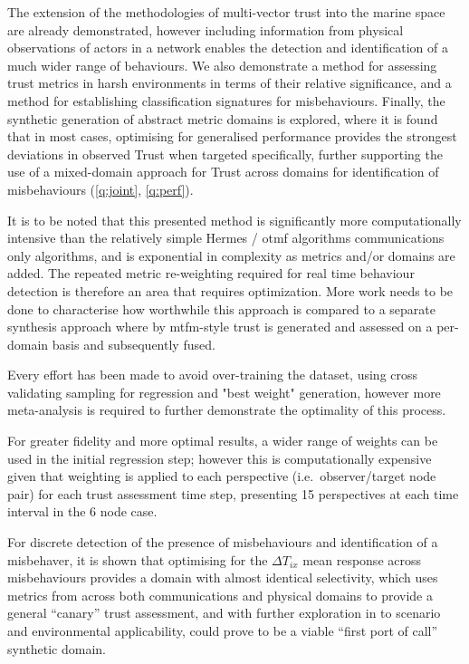 The extension of the methodologies of multi-vector trust into the marine space are already demonstrated, however including information from physical observations of actors in a network enables the detection and identification of a much wider range of behaviours.
We also demonstrate a method for assessing trust metrics in harsh environments in terms of their relative significance, and a method for establishing classification signatures for misbehaviours.
Finally, the synthetic generation of abstract metric domains is explored, where it is found that in most cases, optimising for generalised performance provides the strongest deviations in observed Trust when targeted specifically, further supporting the use of a mixed-domain approach for Trust across domains for identification of misbehaviours (\autoref{q:joint}, \autoref{q:perf}).

It is to be noted that this presented method is significantly more computationally intensive than the relatively simple Hermes / \gls{otmf} algorithms communications only algorithms, and is exponential in complexity as metrics and/or domains are added. The repeated metric re-weighting required for real time behaviour detection is therefore an area that requires optimization. More work needs to be done to characterise how worthwhile this approach is compared to a separate synthesis approach where by \gls{mtfm}-style trust is generated and assessed on a per-domain basis and subsequently fused.

Every effort has been made to avoid over-training the dataset, using cross validating sampling for regression and "best weight" generation, however more meta-analysis is required to further demonstrate the optimality of this process.

For greater fidelity and more optimal results, a wider range of weights can be used in the initial regression step; however this is computationally expensive given that weighting is applied to each perspective (i.e.\ observer/target node pair) for each trust assessment time step, presenting 15 perspectives at each time interval in the 6 node case.

For discrete detection of the presence of misbehaviours and identification of a misbehaver, it is shown that optimising for the $\Delta T_{ix}$ mean response across misbehaviours provides a domain with almost identical selectivity, which uses metrics from across both communications and physical domains to provide a general ``canary'' trust assessment, and with further exploration in to scenario and environmental applicability, could prove to be a viable ``first port of call'' synthetic domain.




